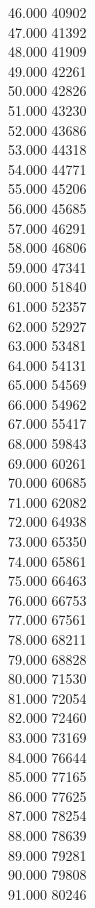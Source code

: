 { 46.000	40902 \\
 47.000	41392 \\
 48.000	41909 \\
 49.000	42261 \\
 50.000	42826 \\
 51.000	43230 \\
 52.000	43686 \\
 53.000	44318 \\
 54.000	44771 \\
 55.000	45206 \\
 56.000	45685 \\
 57.000	46291 \\
 58.000	46806 \\
 59.000	47341 \\
 60.000	51840 \\
 61.000	52357 \\
 62.000	52927 \\
 63.000	53481 \\
 64.000	54131 \\
 65.000	54569 \\
 66.000	54962 \\
 67.000	55417 \\
 68.000	59843 \\
 69.000	60261 \\
 70.000	60685 \\
 71.000	62082 \\
 72.000	64938 \\
 73.000	65350 \\
 74.000	65861 \\
 75.000	66463 \\
 76.000	66753 \\
 77.000	67561 \\
 78.000	68211 \\
 79.000	68828 \\
 80.000	71530 \\
 81.000	72054 \\
 82.000	72460 \\
 83.000	73169 \\
 84.000	76644 \\
 85.000	77165 \\
 86.000	77625 \\
 87.000	78254 \\
 88.000	78639 \\
 89.000	79281 \\
 90.000	79808 \\
 91.000	80246 \\
}
